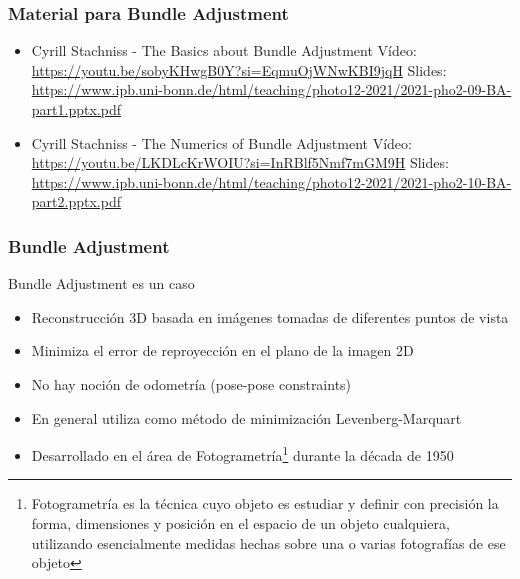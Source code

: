 \begin{frame}
    \frametitle{Material para Bundle Adjustment}
    \begin{itemize}
        \item Cyrill Stachniss - The Basics about Bundle Adjustment Vídeo: \url{https://youtu.be/sobyKHwgB0Y?si=EqmuOjWNwKBI9jqH} Slides: \url{https://www.ipb.uni-bonn.de/html/teaching/photo12-2021/2021-pho2-09-BA-part1.pptx.pdf}
        \item Cyrill Stachniss - The Numerics of Bundle Adjustment Vídeo: \url{https://youtu.be/LKDLcKrWOIU?si=InRBlf5Nmf7mGM9H} Slides: \url{https://www.ipb.uni-bonn.de/html/teaching/photo12-2021/2021-pho2-10-BA-part2.pptx.pdf}
    \end{itemize}
\end{frame}

\begin{frame}
    \frametitle{Bundle Adjustment}
    
    
    Bundle Adjustment es un caso
    
    \begin{itemize}
        \item Reconstrucción 3D basada en imágenes tomadas de diferentes puntos de vista
        \item Minimiza el error de reproyección en el plano de la imagen 2D
        \item No hay noción de odometría (pose-pose constraints)
        \item En general utiliza como método de minimización Levenberg-Marquart
        \item Desarrollado en el área de Fotogrametría\footnote{Fotogrametría es la técnica cuyo objeto es estudiar y definir con precisión la forma, dimensiones y posición en el espacio de un objeto cualquiera, utilizando esencialmente medidas hechas sobre una o varias fotografías de ese objeto} durante la década de 1950
    \end{itemize}
    
\end{frame}

